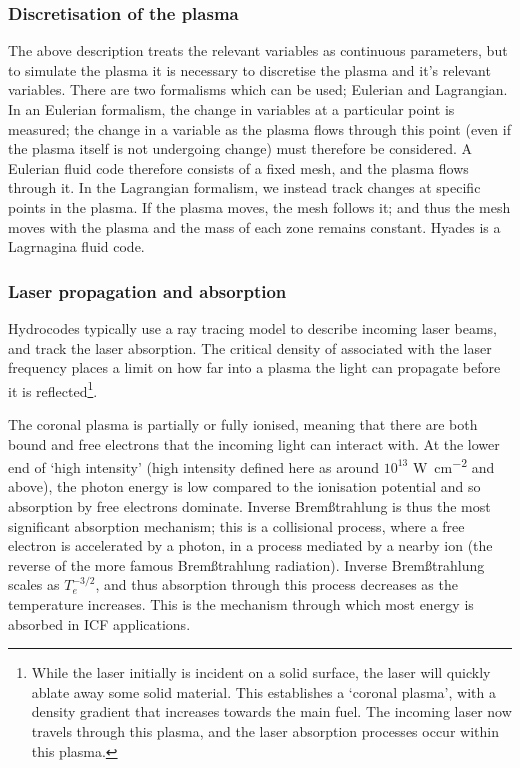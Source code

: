 \subsubsection{Discretisation of the plasma}
The above description treats the relevant variables as continuous parameters, but to simulate the plasma it is necessary to discretise the plasma and it's relevant variables. There are two formalisms which can be used; Eulerian and Lagrangian. In an Eulerian formalism, the change in variables at a particular point is measured; the change in a variable as the plasma flows through this point (even if the plasma itself is not undergoing change) must therefore be considered. A Eulerian fluid code therefore consists of a fixed mesh, and the plasma flows through it. In the Lagrangian formalism, we instead track changes at specific points in the plasma. If the plasma moves, the mesh follows it; and thus the mesh moves with the plasma and the mass of each zone remains constant. Hyades is a Lagrnagina fluid code.

\subsubsection{Laser propagation and absorption}
Hydrocodes typically use a ray tracing model to describe incoming laser beams, and track the laser absorption. The critical density of associated with the laser frequency places a limit on how far into a plasma the light can propagate before it is reflected\footnote{While the laser initially is incident on a solid surface, the laser will quickly ablate away some solid material. This establishes a `coronal plasma', with a density gradient that increases towards the main fuel. The incoming laser now travels through this plasma, and the laser absorption processes occur within this plasma.}.

The coronal plasma is partially or fully ionised, meaning that there are both bound and free electrons that the incoming light can interact with. At the lower end of `high intensity' (high intensity defined here as around $10^{13}$ \unit{\watt\per\centi\meter\squared} and above), the photon energy is low compared to the ionisation potential and so absorption by free electrons dominate. Inverse Brem{\ss}trahlung is thus the most significant absorption mechanism; this is a collisional process, where a free electron is accelerated by a photon, in a process mediated by a nearby ion (the reverse of the more famous Brem{\ss}trahlung radiation). Inverse Brem{\ss}trahlung scales as $T_e^{-3/2}$, and thus absorption through this process decreases as the temperature increases. This is the mechanism through which most energy is absorbed in ICF applications.

